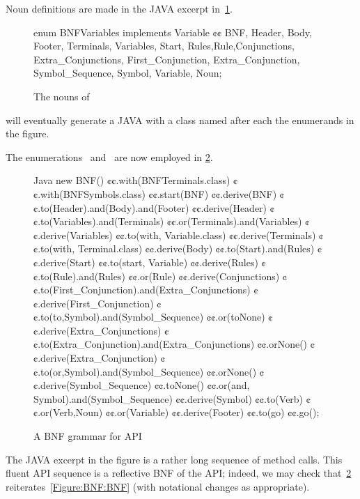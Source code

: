Noun definitions are made in the JAVA excerpt in~\cref{Figure:Nouns}.

\begin{figure}[htb]
  \begin{JAVA}[style=JAVA]
enum BNFVariables implements Variable {¢¢
  BNF, Header, Body, Footer,
  Terminals, Variables, Start,
  Rules,Rule,Conjunctions, Extra_Conjunctions,
  First_Conjunction, Extra_Conjunction, Symbol_Sequence,
  Symbol, Variable, Noun;
}\end{JAVA}
  \caption{The nouns of \Self}
  \label{Figure:Nouns}
\end{figure}
  \Self will eventually generate a JAVA with
  a class named after each the enumerands in the figure.

The enumerations~ and~
  are now employed in \cref{Figure:BNF:fluent}.

\begin{figure}
  \begin{Code}{Java}
new BNF()
  ¢¢.with(BNFTerminals.class)
  ¢¢.with(BNFSymbols.class)
  ¢¢.start(BNF)
  ¢¢.derive(BNF)
    ¢¢.to(Header).and(Body).and(Footer)
  ¢¢.derive(Header)
    ¢¢.to(Variables).and(Terminals)
    ¢¢.or(Terminals).and(Variables)
  ¢¢.derive(Variables)
    ¢¢.to(with, Variable.class)
  ¢¢.derive(Terminals)
    ¢¢.to(with, Terminal.class)
  ¢¢.derive(Body)
    ¢¢.to(Start).and(Rules)
  ¢¢.derive(Start)
    ¢¢.to(start, Variable)
  ¢¢.derive(Rules)
    ¢¢.to(Rule).and(Rules)
    ¢¢.or(Rule)
  ¢¢.derive(Conjunctions)
    ¢¢.to(First_Conjunction).and(Extra_Conjunctions)
  ¢¢.derive(First_Conjunction)
    ¢¢.to(to,Symbol).and(Symbol_Sequence)
    ¢¢.or(toNone)
  ¢¢.derive(Extra_Conjunctions)
    ¢¢.to(Extra_Conjunction).and(Extra_Conjunctions)
    ¢¢.orNone()
  ¢¢.derive(Extra_Conjunction)
    ¢¢.to(or,Symbol).and(Symbol_Sequence)
    ¢¢.orNone()
  ¢¢.derive(Symbol_Sequence)
    ¢¢.toNone()
    ¢¢.or(and, Symbol).and(Symbol_Sequence)
  ¢¢.derive(Symbol)
    ¢¢.to(Verb)
    ¢¢.or(Verb,Noun)
    ¢¢.or(Variable)
  ¢¢.derive(Footer)
    ¢¢.to(go)
¢¢.go();
\end{Code}
  \caption{A BNF grammar for \Self API}
  \label{Figure:BNF:fluent}
\end{figure}

The JAVA excerpt in the figure is a rather long
  sequence of method calls.
This fluent API sequence is a reflective BNF
  of the \Self API;
  indeed, we may check that~\cref{Figure:BNF:fluent} reiterates~\cref{Figure:BNF:BNF}
  (with notational changes as appropriate).

